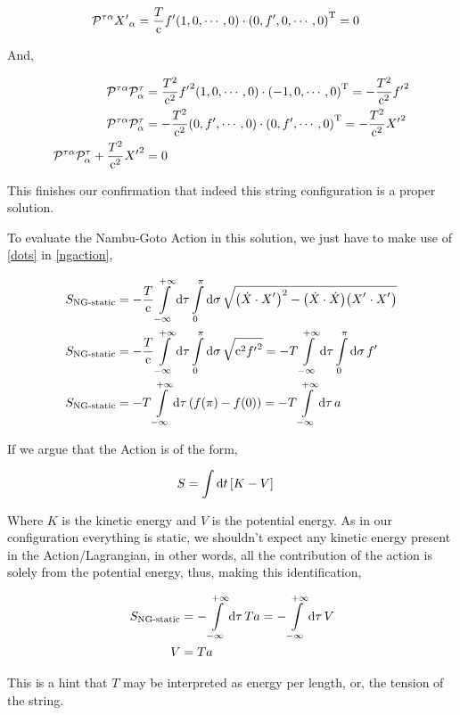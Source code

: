 \begin{align*}
    \mathcal P^{\tau\alpha}{X'}_\alpha&=\frac{T}{\textnormal{c}}f'\qty(1,0,\cdots,0)\cdot{\qty(0,f',0,\cdots,0)}^{\textnormal{T}}=0
\end{align*}

And,

\begin{align*}
    \mathcal P^{\tau\alpha}\mathcal P^{\tau}_\alpha&=\frac{T^2}{\textnormal{c}^2}{f'}^2\qty(1,0,\cdots,0)\cdot{\qty(-1,0,\cdots,0)}^{\textnormal{T}}=-\frac{T^2}{\textnormal{c}^2}{f'}^2\\
    \mathcal P^{\tau\alpha}\mathcal P^{\tau}_\alpha&=-\frac{T^2}{\textnormal{c}^2}\qty(0,f',\cdots,0)\cdot{\qty(0,f',\cdots,0)}^{\textnormal{T}}=-\frac{T^2}{\textnormal{c}^2}{X'}^2\\
    \mathcal P^{\tau\alpha}\mathcal P^{\tau}_\alpha+\frac{T^2}{\textnormal{c}^2}{X'}^2&=0
\end{align*}

This finishes our confirmation that indeed this string configuration is a proper solution.

\probitem{}

To evaluate the Nambu-Goto Action in this solution, we just have to make use of \ref{dots} in \ref{ngaction},

\begin{align*}
    S_{\textnormal{NG-static}}&=-\frac{T}{\luz}\int\limits_{-\infty}^{+\infty}\dd{\tau}\int\limits_0^\pi\dd{\sigma}\sqrt{\qty(\dot X\cdot X^\sidev)^2- \qty(\dot X\cdot \dot X)\qty(X^\sidev\cdot X^\sidev) }\\
    S_{\textnormal{NG-static}}&=-\frac{T}{\luz}\int\limits_{-\infty}^{+\infty}\dd{\tau}\int\limits_0^\pi\dd{\sigma}\sqrt{\luz^2{f'}^2}=-T\int\limits_{-\infty}^{+\infty}\dd{\tau}\int\limits_0^\pi\dd{\sigma}f'\\
    S_{\textnormal{NG-static}}&=-T\int\limits_{-\infty}^{+\infty}\dd{\tau}\qty(f\qty(\pi)-f(0))=-T\int\limits_{-\infty}^{+\infty}\dd{\tau}a
\end{align*}

If we argue that the Action is of the form,

\begin{align*}
    S&=\int\dd{t}\qty[K-V]
\end{align*}

Where $K$ is the kinetic energy and $V$ is the potential energy. As in our configuration everything is static, we shouldn't expect any kinetic energy present in the Action/Lagrangian, in other words, all the contribution of the action is solely from 
the potential energy, thus, making this identification,

\begin{align*}
    S_{\textnormal{NG-static}}&=-\int\limits_{-\infty}^{+\infty}\dd{\tau}Ta=-\int\limits_{-\infty}^{+\infty}\dd{\tau}V\\
    V&=Ta
\end{align*}

This is a hint that $T$ may be interpreted as energy per length, or, the tension of the string.